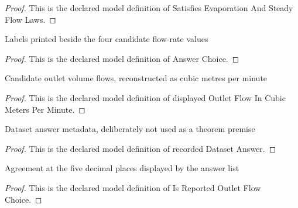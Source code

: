 \begin{proof}
  This is the declared model definition of Satisfies Evaporation And Steady Flow Laws.
\end{proof}
\begin{definition}
  \label{def:physics:phyx-mini-0445:phyxminiproblems-problemphyxmini0445-answerchoice}
  Labels printed beside the four candidate flow-rate values
\end{definition}
\begin{proof}
  This is the declared model definition of Answer Choice.
\end{proof}
\begin{definition}
  \label{def:physics:phyx-mini-0445:phyxminiproblems-problemphyxmini0445-displayedoutletflowincubicmetersperminute}
  Candidate outlet volume flows, reconstructed as cubic metres per minute
\end{definition}
\begin{proof}
  This is the declared model definition of displayed Outlet Flow In Cubic Meters Per Minute.
\end{proof}
\begin{definition}
  \label{def:physics:phyx-mini-0445:phyxminiproblems-problemphyxmini0445-recordeddatasetanswer}
  Dataset answer metadata, deliberately not used as a theorem premise
\end{definition}
\begin{proof}
  This is the declared model definition of recorded Dataset Answer.
\end{proof}
\begin{definition}
  \label{def:physics:phyx-mini-0445:phyxminiproblems-problemphyxmini0445-isreportedoutletflowchoice}
  Agreement at the five decimal places displayed by the answer list
\end{definition}
\begin{proof}
  This is the declared model definition of Is Reported Outlet Flow Choice.
\end{proof}
